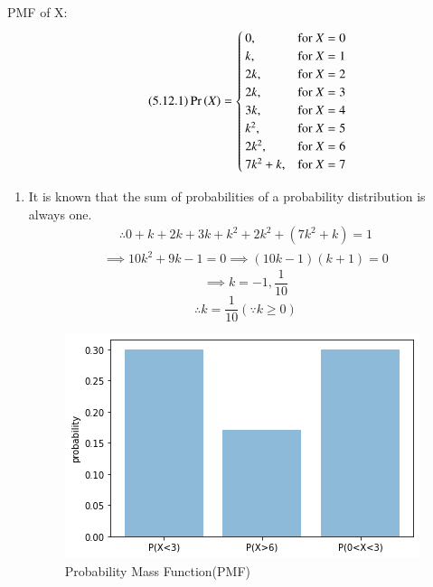 \documentclass[journal,12pt,twocolumn]{IEEEtran}
\begin{document}
PMF of X:
\begin{align}
 \tag{5.12.1}
 \Pr\left(X\right) = 
  \begin{cases}
    0, & \text{for }  X = 0 \\
    k, & \text{for }  X = 1 \\
    2k, & \text{for } X = 2 \\
    2k, & \text{for } X = 3 \\
    3k, & \text{for } X = 4 \\
    k^2, & \text{for } X = 5 \\
    2k^2, & \text{for } X = 6 \\
    7k^2 + k, & \text{for } X = 7 \\
    \end{cases}
  \end{align}
\begin{enumerate}
    \item It is known that the sum of probabilities of a probability distribution is always one. 
\begin{align}
\tag{5.12.2}
    \therefore 0 + k + 2k + 3k + k^2 + 2k^2 + (7k^2 + k) = 1 
\end{align}
\begin{align}
\tag{5.12.3}
\implies 10k^2 + 9k - 1 = 0 
 \implies  (10k - 1)(k + 1) = 0 
 \end{align}
  \begin{equation}
  \tag{5.12.4}
 \implies  k = -1, \frac{1}{10} 
\end{equation}
\begin{equation}
    \tag{1}
 \therefore k = \frac{1}{10} (\because k \ge 0)
 \end{equation}
 
 \begin{figure}[!htb]
    \centering    
	\includegraphics[width=\columnwidth]{probability.png}
    \caption{Probability Mass Function(PMF)}
\end{figure}
 

\end{enumerate}
\end{document}
